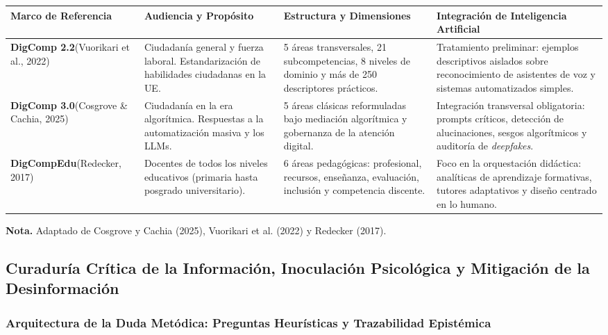 \begin{table}[htpb!]
\centering
\small
\begin{tabularx}{\textwidth}{p{2.8cm} p{3.8cm} p{4.2cm} X}
\toprule
\textbf{Marco de Referencia} & \textbf{Audiencia y Propósito} & \textbf{Estructura y Dimensiones} & \textbf{Integración de Inteligencia Artificial} \\
\midrule
\textbf{DigComp 2.2}\newline(Vuorikari et al., 2022) & Ciudadanía general y fuerza laboral. Estandarización de habilidades ciudadanas en la UE. & 5 áreas transversales, 21 subcompetencias, 8 niveles de dominio y más de 250 descriptores prácticos. & Tratamiento preliminar: ejemplos descriptivos aislados sobre reconocimiento de asistentes de voz y sistemas automatizados simples. \\
\midrule
\textbf{DigComp 3.0}\newline(Cosgrove \& Cachia, 2025) & Ciudadanía en la era algorítmica. Respuestas a la automatización masiva y los LLMs. & 5 áreas clásicas reformuladas bajo mediación algorítmica y gobernanza de la atención digital. & Integración transversal obligatoria: prompts críticos, detección de alucinaciones, sesgos algorítmicos y auditoría de \textit{deepfakes}. \\
\midrule
\textbf{DigCompEdu}\newline(Redecker, 2017) & Docentes de todos los niveles educativos (primaria hasta posgrado universitario). & 6 áreas pedagógicas: profesional, recursos, enseñanza, evaluación, inclusión y competencia discente. & Foco en la orquestación didáctica: analíticas de aprendizaje formativas, tutores adaptativos y diseño centrado en lo humano. \\
\bottomrule
\end{tabularx}
\vspace{0.2cm}
\begin{flushleft}
\scriptsize \textbf{Nota.} Adaptado de Cosgrove y Cachia (2025), Vuorikari et al. (2022) y Redecker (2017).
\end{flushleft}
\end{table}

\newpage

\subsection{Curaduría Crítica de la Información, Inoculación Psicológica y Mitigación de la Desinformación}

\subsubsection{Arquitectura de la Duda Metódica: Preguntas Heurísticas y Trazabilidad Epistémica}


